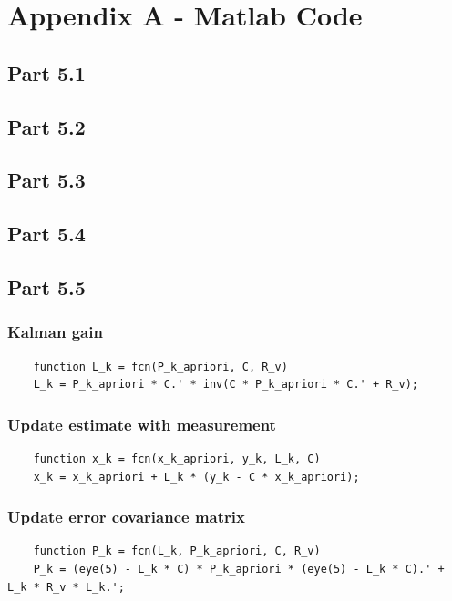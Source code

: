 \appendix



\section{Appendix A - Matlab Code}
\label{sec:Appendix A}
\begin{subappendices} 
\subsection{Part 5.1}

\subsection{Part 5.2}


\subsection{Part 5.3}

\subsection{Part 5.4}

\subsection{Part 5.5}

\subsubsection{Kalman gain}
\begin{lstlisting}
    function L_k = fcn(P_k_apriori, C, R_v)
    L_k = P_k_apriori * C.' * inv(C * P_k_apriori * C.' + R_v);
\end{lstlisting}

\subsubsection{Update estimate with measurement}
\begin{lstlisting}
    function x_k = fcn(x_k_apriori, y_k, L_k, C)
    x_k = x_k_apriori + L_k * (y_k - C * x_k_apriori);
\end{lstlisting}

\subsubsection{Update error covariance matrix}
\begin{lstlisting}
    function P_k = fcn(L_k, P_k_apriori, C, R_v)
    P_k = (eye(5) - L_k * C) * P_k_apriori * (eye(5) - L_k * C).' + L_k * R_v * L_k.';
\end{lstlisting}


\end{subappendices}
